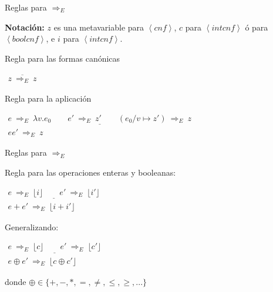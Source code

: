 \documentclass[handout]{beamer}
\newcommand{\cnf}{\left\langle cnf\right\rangle}
\newcommand{\intcnf}{\left\langle intcnf\right\rangle}
\newcommand{\boolcnf}{\left\langle boolcnf\right\rangle}
\begin{document}
\begin{frame}{Reglas para $\Rightarrow_E$}

  \textbf{Notación:} $z$ es una metavariable para $\cnf$, $c$ para
  $\intcnf$ ó para $\boolcnf$, e $i$ para $\intcnf$.

\bigskip

Regla para las formas canónicas

\bigskip

$\begin{array}{c}
\overline{z\ \Rightarrow_E\ z}
\end{array}
$


\bigskip

\medskip

Regla para la aplicación

\bigskip

$\begin{array}{c}
\underline{e\ \Rightarrow_E\ \lambda v.e_0\qquad e'\ \Rightarrow_E\ z'\qquad(e_0/v\mapsto z')\ \Rightarrow_E\ z}\\
ee'\ \Rightarrow_E\ z
\end{array}
$

\end{frame}


\begin{frame}{Reglas para $\Rightarrow_E$}


Regla para las operaciones enteras y booleanas:

\bigskip

$\begin{array}{c}
\underline{e\ \Rightarrow_E\ \lfloor i\rfloor\qquad e'\ \Rightarrow_E\ \lfloor i'\rfloor}\\
e+e'\ \Rightarrow_E\ \lfloor i+i'\rfloor
\end{array}
$\pause

\bigskip

Generalizando:

\bigskip


$\begin{array}{c}
\underline{e\ \Rightarrow_E\ \lfloor c\rfloor\qquad e'\ \Rightarrow_E\ \lfloor c'\rfloor}\\
e \oplus e'\ \Rightarrow_E\ \lfloor c\oplus c'\rfloor
\end{array}
$

\qquad\qquad\qquad\qquad\qquad\qquad donde $\oplus\in \{+,-,*,=,\neq,\leq,\geq,...\}$


\end{frame}
\end{document}
